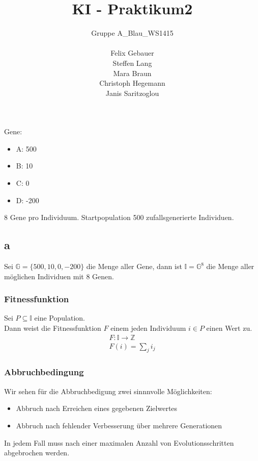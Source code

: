 \documentclass[12pt, a4paper]{article}
\title{KI - Praktikum2}
\author{Gruppe A\_Blau\_WS1415\\\\
    Felix Gebauer\\
    Steffen Lang\\
    Mara Braun\\
    Christoph Hegemann\\
    Janis Saritzoglou}
\begin{document}
\maketitle
\newpage
\section{}
Gene:
\begin{itemize}
\item A: 500
\item B: 10
\item C: 0
\item D: -200
\end{itemize}
8 Gene pro Individuum. Startpopulation 500 zufallsgenerierte
Individuen.

\subsection*{a}
Sei $\mathbb{G} = \{500,10,0,-200\}$ die Menge aller Gene, dann ist
$\mathbb{I} = \mathbb{G}^8$ die Menge aller möglichen Individuen mit 8
Genen.

\subsubsection*{Fitnessfunktion}
Sei $P \subseteq \mathbb{I}$ eine Population.\\
Dann weist die Fitnessfunktion $F$ einem jeden Individuum $i \in P$
einen Wert zu.\\
\begin{align*}
F: \mathbb{I} \longrightarrow \mathbb{Z}\\
F(i) = \sum_j i_j
\end{align*}

\subsubsection*{Abbruchbedingung}
Wir sehen für die Abbruchbedigung zwei sinnnvolle Möglichkeiten:
\begin{itemize}
\item Abbruch nach Erreichen eines gegebenen Zielwertes
\item Abbruch nach fehlender Verbesserung über mehrere Generationen
\end{itemize}
In jedem Fall muss nach einer maximalen Anzahl von Evolutionsschritten
abgebrochen werden.
\end{document}
